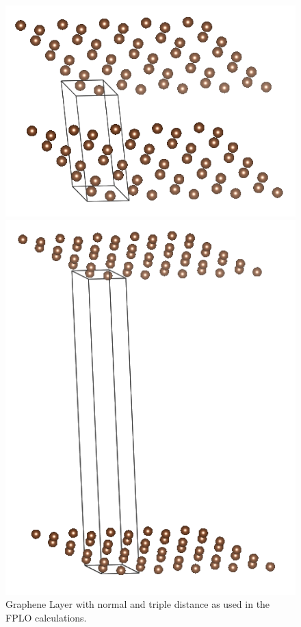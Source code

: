 			\begin{figure}
				\centering			
				\begin{minipage}[t]{0.4\textwidth}
					\includegraphics[width=\textwidth]{Results/Figures/GrapheneLayer6A.png}
				\end{minipage}				\begin{minipage}[t]{0.4\textwidth}
						\includegraphics[width=\textwidth]{Results/Figures/GrapheneLayer20A.png}
				\end{minipage}	
				\caption{Graphene Layer with normal and triple distance as used in the FPLO calculations.}
				\label{fig:grapheneLayers}
			\end{figure}
